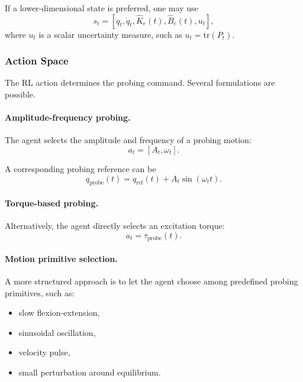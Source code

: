 \documentclass[11pt]{article}
\begin{document}
If a lower-dimensional state is preferred, one may use
\begin{equation}
s_t = [q_t,\dot{q}_t,\hat{K}_e(t),\hat{B}_e(t),u_t],
\end{equation}
where \(u_t\) is a scalar uncertainty measure, such as \(u_t=\mathrm{tr}(P_t)\).

\subsubsection{Action Space}

The RL action determines the probing command. Several formulations are possible.

\paragraph{Amplitude-frequency probing.}
The agent selects the amplitude and frequency of a probing motion:
\begin{equation}
a_t = [A_t,\omega_t].
\end{equation}

A corresponding probing reference can be
\begin{equation}
q_{\mathrm{probe}}(t) = q_{\mathrm{ref}}(t) + A_t \sin(\omega_t t).
\label{eq:probe_signal}
\end{equation}

\paragraph{Torque-based probing.}
Alternatively, the agent directly selects an excitation torque:
\begin{equation}
a_t = \tau_{\mathrm{probe}}(t).
\end{equation}

\paragraph{Motion primitive selection.}
A more structured approach is to let the agent choose among predefined probing primitives, such as:
\begin{itemize}
    \item slow flexion-extension,
    \item sinusoidal oscillation,
    \item velocity pulse,
    \item small perturbation around equilibrium.
\end{itemize}
\end{document}
